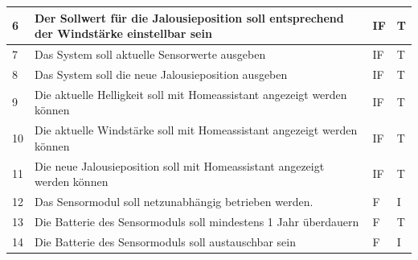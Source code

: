 \begin{longtable}[ht]{p{}  p{} p{} p{}}
	6 & Der Sollwert für die Jalousieposition soll entsprechend der Windstärke einstellbar sein                                                                                                                                    & IF& T                                   \\* \midrule
	7 & Das System soll aktuelle Sensorwerte ausgeben                                                                                                                                  & IF& T                                   \\* \midrule
	8 & Das System soll die neue Jalousieposition ausgeben                                                                                                                                       & IF& T                                   \\* \midrule
	9 & Die aktuelle Helligkeit soll mit Homeassistant angezeigt werden können                                                                                                                                 & IF& T                                   \\* \midrule
	10 & Die aktuelle Windstärke soll mit Homeassistant angezeigt werden können                                                                                                                                    & IF& T                                   \\* \midrule
	11 & Die neue Jalousieposition soll mit Homeassistant angezeigt werden können 	                                                                                                                                     & IF& T                                   \\* \midrule
	12 & Das Sensormodul soll netzunabhängig betrieben werden.                                                                                                                                  & F& I                                   \\* \midrule
	13 & Die Batterie des Sensormoduls soll mindestens 1 Jahr überdauern                                                                                                                                     & F& T                                   \\* \midrule
	14 & Die Batterie des Sensormoduls soll austauschbar sein                                                                                                                                      & F& I                                  \\* \midrule

\end{longtable}
